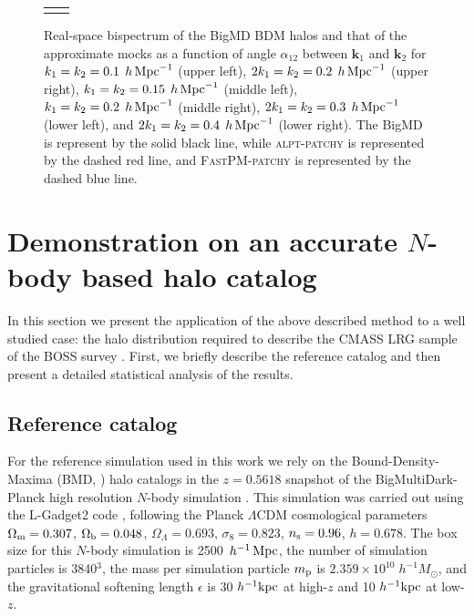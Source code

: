 \documentclass[english,usenatbib]{mn2e}
\newcommand{\mperh}{\,h^{-1}\,{\rm Mpc}}
\newcommand{\hperm}{\,h\,{\rm Mpc}^{-1}}
\begin{document}
\begin{figure}
\begin{tabular}{cc}
\vspace{-0.25cm}
\end{tabular}
\caption{\label{fig:bispec} Real-space bispectrum of the BigMD BDM halos and that of the approximate mocks as a function of angle $\alpha_{12}$ between $\mathbf{k}_1$ and $\mathbf{k}_{2}$ for $k_{1}=k_{2}=0.1\; \hperm$ (upper left), $2k_{1}=k_{2}=0.2\; \hperm$ (upper right), $k_{1}=k_{2}=0.15\; \hperm$ (middle left), $k_{1}=k_{2}=0.2\; \hperm$ (middle right), $2k_{1}=k_{2}=0.3\; \hperm$ (lower left), and $2k_{1}=k_{2}=0.4\; \hperm$ (lower right). The BigMD is represent by the solid black line, while \textsc{alpt}-\textsc{patchy} is represented by the dashed red line, and \textsc{FastPM}-\textsc{patchy} is represented by the dashed blue line.}
\end{figure}


\section{Demonstration on an accurate $N$-body based halo catalog}
\label{sec:test}

In this section we present the application of the above described method to a well studied case: the halo distribution required to describe the CMASS LRG sample of the BOSS survey \citep{white2011,Dawson2013}.
First, we briefly describe the reference catalog and then present a detailed statistical analysis of the results.

\subsection{Reference catalog}
\label{sec:reference}

For the reference simulation used in this work we rely on the Bound-Density-Maxima (BMD, \citealt{bdm}) halo catalogs in the $z=0.5618$ snapshot of the BigMultiDark-Planck high 
resolution $N$-body simulation \citep{multidark}. This simulation was carried out using the L-Gadget2 code \citep{gadget}, following the Planck $\Lambda$CDM cosmological parameters 
$\Omega_{\rm m} = 0.307$, $\Omega_{\rm b} = 0.048$, $\Omega_{\Lambda} = 0.693$, $\sigma_{8} = 0.823$, $n_{\rm s}=0.96$, 
$h=0.678$. The box size for this $N$-body simulation is 2500 $\mperh$, the number of simulation particles is 3840$^3$, 
the mass per simulation particle $m_{\rm p}$ is $2.359 \times 10^{10} \; h^{-1} M_{\odot}$, and the gravitational softening length 
$\epsilon$ is 30 $h^{-1} \rm{kpc}$ at high-$z$ and 10 $h^{-1} \rm{kpc}$ at low-$z$.
\end{document}
